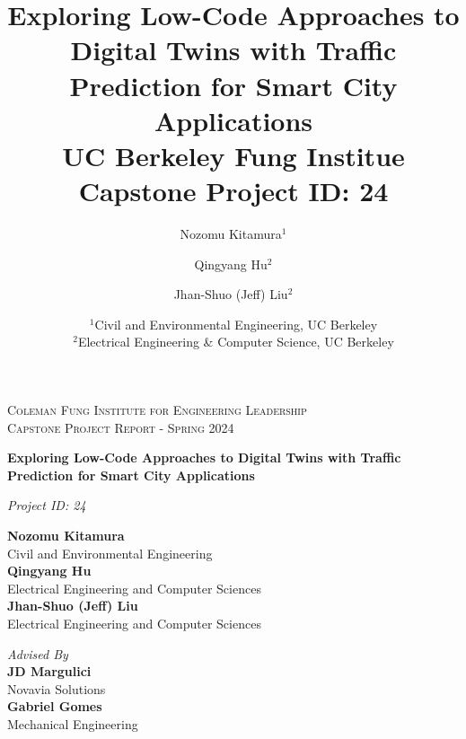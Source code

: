 \documentclass[twocolumn]{report}
\title{{\bf Exploring Low-Code Approaches to Digital Twins with Traffic Prediction for Smart City Applications} \\ \medskip \Large UC Berkeley Fung Institue Capstone Project ID: 24}
\author{Nozomu Kitamura$^1$ \and Qingyang Hu$^2$ \and Jhan-Shuo (Jeff) Liu$^2$}
\date{%
    $^1$Civil and Environmental Engineering, UC Berkeley\\%
    $^2$Electrical Engineering \& Computer Science, UC Berkeley\\[1ex]%
}
\begin{document}
\begin{titlepage}
	\centering
    {\scshape\Large Coleman Fung Institute for Engineering Leadership \\ Capstone Project Report - Spring 2024\par}
    \vfill
    
	{\huge\bf Exploring Low-Code Approaches to Digital Twins with Traffic Prediction for Smart City Applications\par}
    \vspace{1cm}
    
    {\large {\it Project ID: 24}}
	\vfill
	
	{\Large 
    {\bf Nozomu Kitamura} \\ Civil and Environmental Engineering \\ \medskip 
    {\bf Qingyang Hu}  \\ Electrical Engineering and Computer Sciences \\ 
    \medskip 
    {\bf Jhan-Shuo (Jeff) Liu} \\ Electrical Engineering and Computer Sciences\\}\par

	\vfill
	{\it Advised By} \\ \medskip
	{\bf JD Margulici} \\ Novavia Solutions \\ \medskip
    {\bf Gabriel Gomes} \\ Mechanical Engineering
    


	\vfill
\end{titlepage}
\newpage
\tableofcontents


\newpage






\newpage
\printbibliography[heading=bibintoc, title={References}]
\end{document}
